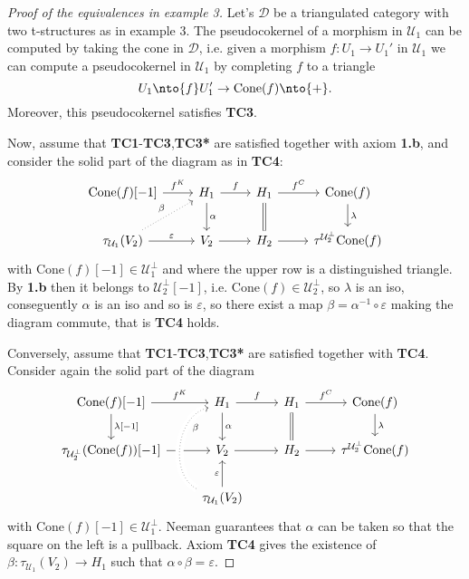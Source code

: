 \begin{proof}[Proof of the equivalences in example 3]
  Let's $\mathcal{D}$ be a triangulated category with two t-structures as in example 3. The pseudocokernel
  of a morphism in $\mathcal{U}_1$ can be computed by taking the cone in $\mathcal{D}$, i.e. given a morphism
  $f:U_1\to U_1'$ in $\mathcal{U}_1$ we can compute a pseudocokernel in $\mathcal{U}_1$ by completing $f$
  to a triangle
  \begin{equation*}
    U_1\nto{f}U_1'\to \mathrm{Cone}(f)\nto{+}.
  \end{equation*}
  Moreover, this pseudocokernel satisfies \textbf{TC3}.

  Now, assume that \textbf{TC1}-\textbf{TC3},\textbf{TC3*} are satisfied together with axiom
  \textbf{1.b}, and consider the solid part of the diagram as in \textbf{TC4}:
  \begin{equation*}
    \begin{tikzcd}
      \mathrm{Cone}(f)[-1]\arrow{r}{f^K}
        & H_1\arrow{r}{f}\arrow{d}{\alpha}
          & H_1\arrow{r}{f^C}\arrow[equal]{d}
            & \mathrm{Cone}(f)\arrow{d}{\lambda}\\
      \tau_{\mathcal{U}_1}(V_2)\arrow{r}{\varepsilon}\arrow[dotted]{ur}{\beta}
        & V_2\arrow{r}
          & H_2\arrow{r}
            & \tau^{\mathcal{U}_2^\perp}\mathrm{Cone}(f)
    \end{tikzcd}
  \end{equation*}
  with $\mathrm{Cone}(f)[-1]\in\mathcal{U}_1^\perp$ and where the upper row is a
  distinguished triangle. By \textbf{1.b} then it belongs
  to $\mathcal{U}_2^\perp[-1]$, i.e. $\mathrm{Cone}(f)\in\mathcal{U}_2^\perp$, so
  $\lambda$ is an iso, conseguently $\alpha$ is an iso and so is $\varepsilon$, so
  there exist a map $\beta=\alpha^{-1}\circ\varepsilon$ making the diagram commute, that
  is \textbf{TC4} holds.

  Conversely, assume that \textbf{TC1}-\textbf{TC3},\textbf{TC3*} are satisfied together with
  \textbf{TC4}. Consider again the solid part of the diagram
  \begin{equation*}
    \begin{tikzcd}
      \mathrm{Cone}(f)[-1]\arrow{r}{f^K}\arrow{d}{\lambda[-1]}
        & H_1\arrow{r}{f}\arrow{d}{\alpha}
          & H_1\arrow{r}{f^C}\arrow[equal]{d}
            & \mathrm{Cone}(f)\arrow{d}{\lambda}\\
      \tau_{\mathcal{U}_2^\perp}(\mathrm{Cone}(f))[-1]\arrow{r}
        & V_2\arrow{r}
          & H_2\arrow{r}
            & \tau^{\mathcal{U}_2^\perp}\mathrm{Cone}(f)\\
        & \tau_{\mathcal{U}_1}(V_2)\arrow{u}{\varepsilon}\arrow[dotted, crossing over, bend left=70]{uu}[near end,']{\beta}
        & &
    \end{tikzcd}
  \end{equation*}
  with $\mathrm{Cone}(f)[-1]\in\mathcal{U}_1^\perp$. Neeman  guarantees
  that $\alpha$ can be taken so that the square on the left is a pullback. Axiom \textbf{TC4}
  gives the existence of $\beta:\tau_{\mathcal{U}_1}(V_2)\to H_1$ such that $\alpha\circ\beta=\varepsilon$.


\end{proof}
